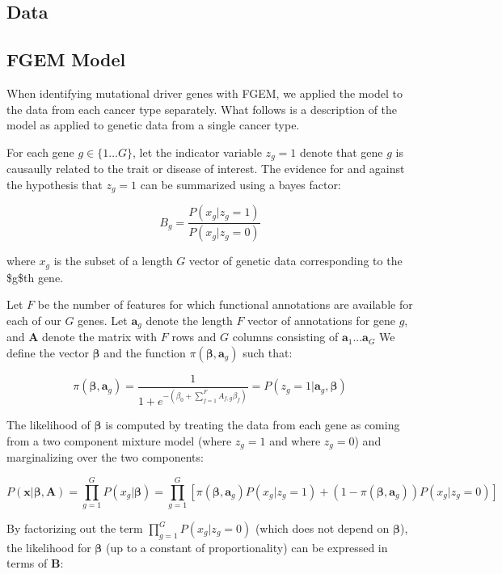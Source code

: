 \subsection{Data}

\subsection{FGEM Model}\label{sec:org4e93496}

When identifying mutational driver genes with FGEM, we applied the model to the data from each cancer type separately.  What follows is a description of the model as applied to genetic data from a single cancer type.

For each gene \(g \in \{1 \dots G\}\), let the indicator variable \(z_g=1\) denote that gene \(g\) is causaully related to the trait or disease of interest.  The evidence for and against the hypothesis that \(z_g=1\) can be summarized using a bayes factor:

$$B_g=\frac{P(x_g|z_g=1)}{P(x_g|z_g=0)}$$

where \(x_g\) is the subset of a length $G$ vector of genetic data corresponding to the \$g\$th gene.

Let \(F\) be the number of features for which functional annotations are available for each of our \(G\) genes.  Let \(\textbf{a}_g\) denote the length \(F\) vector of annotations for gene \(g\), and \(\textbf{A}\) denote the matrix with \(F\) rows and \(G\) 
columns consisting of \(\textbf{a}_1 ...  \textbf{a}_G\)
We define the vector \(\boldsymbol{\beta}\) and the function \(\pi(\boldsymbol{\beta},\textbf{a}_g)\) such that:

$$\pi(\boldsymbol{\beta},\textbf{a}_g) =  \frac{1}{1+e^{-(\beta_{0}+\sum_{f=1}^F{A_{f,g}\beta_f})}} =  P(z_g=1|\textbf{a}_g,\boldsymbol{\beta})$$

The likelihood of \(\boldsymbol{\beta}\) is computed by treating the data from each gene as coming from a two component mixture model (where \(z_g=1\) and where \(z_g=0\)) and marginalizing over the two components:

$$ P(\textbf{x}|\boldsymbol{\beta},\textbf{A})=\prod_{g=1}^{G}P(x_g|\boldsymbol{\beta})=\prod_{g=1}^{G}[\pi(\boldsymbol{\beta},\textbf{a}_g) P(x_g|z_g=1)+(1-\pi(\boldsymbol{\beta},\textbf{a}_g))P(x_g|z_g=0)]$$

By factorizing out the term \(\prod_{g=1}^{G} P(x_g|z_g=0)\) (which does not depend on $\boldsymbol{\beta}$), the likelihood for \(\boldsymbol{\beta}\) (up to a constant of proportionality) can be expressed in terms of \(\textbf{B}\):

